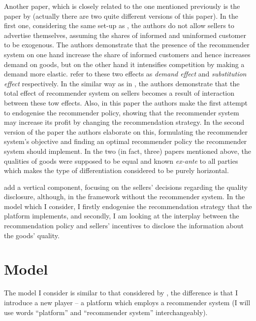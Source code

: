 \documentclass[a4paper]{article}
\begin{document}
	Another paper, which is closely related to the one mentioned previously is the paper by \cite{li2018recommender} (actually there are two quite different versions of this paper). In the first one, considering the same set-up as \cite{chen2016advertising}, the authors do not allow sellers to advertise themselves, assuming the shares of informed and uninformed customer to be exogenous. The authors demonstrate that the presence of the recommender system on one hand increase the share of informed customers and hence increases demand on goods, but on the other hand it intensifies competition by making a demand more elastic. \cite{li2018recommender} refer to these two effects as \textit{demand effect} and \textit{substitution effect} respectively. In the similar way as in \cite{chen2016advertising}, the authors demonstrate that the total effect of recommender system on sellers becomes a result of interaction between these tow effects. Also, in this paper the authors make the first attempt to endogenise the recommender policy, showing that the recommender system may increase its profit by changing the recommendation strategy. In the second version of the paper the authors elaborate on this, formulating the recommender system's objective and finding an optimal recommender policy the recommender system should implement. In the two (in fact, three) papers mentioned above, the qualities of goods were supposed to be equal and known \textit{ex-ante} to all parties which makes the type of differentiation considered to be purely horizontal.
	
	\cite{levin2009quality} add a vertical component, focusing on the sellers' decisions regarding the quality disclosure, although, in the framework without the recommender system. In the model which I consider, I firstly endogenise the recommendation strategy that the platform implements, and secondly, I am looking at the interplay between the recommendation policy and sellers' incentives to disclose the information about the goods' quality.
	
	\section{Model}
	The model I consider is similar to that considered by \cite{levin2009quality}, the difference is that I introduce a new player -- a platform which employs a recommender system (I will use words ``platform'' and ``recommender system'' interchangeably).
		
\end{document}
